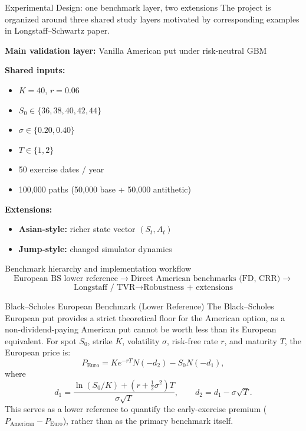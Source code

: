 \documentclass[
  11pt,
  ignorenonframetext,
  aspectratio=169,
]{beamer}
\providecommand{\tightlist}{%
  \setlength{\itemsep}{0pt}\setlength{\parskip}{0pt}}
\begin{document}
\begin{frame}{Experimental Design: one benchmark layer, two extensions}
\label{experimental-design-one-benchmark-layer-two-extensions}
The project is organized around three shared study layers motivated by
corresponding examples in Longstaff--Schwartz paper.

\textbf{Main validation layer:} Vanilla American put under risk-neutral
GBM

\textbf{Shared inputs:}

\begin{itemize}
\tightlist
\item
  \(K=40\), \(r=0.06\)
\item
  \(S_0\in\{36,38,40,42,44\}\)
\item
  \(\sigma\in\{0.20,0.40\}\)
\item
  \(T\in\{1,2\}\)
\item
  50 exercise dates / year
\item
  100,000 paths (50,000 base + 50,000 antithetic)
\end{itemize}

\textbf{Extensions:}

\begin{itemize}
\tightlist
\item
  \textbf{Asian-style:} richer state vector \((S_t,A_t)\)
\item
  \textbf{Jump-style:} changed simulator dynamics
\end{itemize}
\end{frame}

\begin{frame}{Benchmark hierarchy and implementation workflow}
\label{benchmark-hierarchy-and-implementation-workflow}
\[
\text{European BS lower reference}
\rightarrow
\text{Direct American benchmarks (FD, CRR)}
\rightarrow
\] \[
\text{Longstaff / TVR}
\rightarrow
\text{Robustness + extensions}
\]

\begin{block}{Black--Scholes European Benchmark (Lower Reference)}
\label{blackscholes-european-benchmark-lower-reference}
The Black--Scholes European put provides a strict theoretical floor for
the American option, as a non-dividend-paying American put cannot be
worth less than its European equivalent. For spot \(S_0\), strike \(K\),
volatility \(\sigma\), risk-free rate \(r\), and maturity \(T\), the
European price is: \[
P_{\text{Euro}} = K e^{-rT} N(-d_2) - S_0 N(-d_1),
\] where \[
d_1 = \frac{\ln(S_0/K) + \left(r + \tfrac{1}{2}\sigma^2\right)T}{\sigma \sqrt{T}},
\qquad
d_2 = d_1 - \sigma \sqrt{T}.
\] This serves as a lower reference to quantify the early-exercise
premium (\(P_{\text{American}} - P_{\text{Euro}}\)), rather than as the
primary benchmark itself.
\end{block}
\end{frame}
\end{document}
